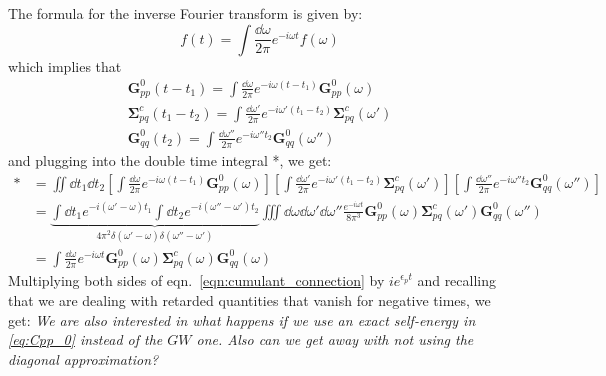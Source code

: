 The formula for the inverse Fourier transform is given by:
\begin{equation}
    f(t) = \int \frac{\dd \omega}{2\pi} e^{-i\omega t} f(\omega)
\end{equation}
which implies that
\begin{align}
    \bm{G}_{pp}^{0}(t-t_1) = \int \frac{\dd \omega}{2\pi} e^{-i\omega (t-t_1)} \bm{G}_{pp}^{0}(\omega)\\
    \bm{\Sigma}_{pq}^c(t_1 - t_2) = \int \frac{\dd \omega'}{2\pi} e^{-i\omega' (t_1 - t_2)} \bm{\Sigma}_{pq}^c(\omega')\\
    \bm{G}_{qq}^{0}(t_2) = \int \frac{\dd \omega''}{2\pi} e^{-i\omega'' t_2} \bm{G}_{qq}^{0}(\omega'')
\end{align}
and plugging into the double time integral *, we get:
\begin{align}
    * &= \iint \dd t_1 \dd t_2 \left[\int \frac{\dd \omega}{2\pi} e^{-i\omega (t-t_1)} \bm{G}_{pp}^{0}(\omega)\right] \left[\int \frac{\dd \omega'}{2\pi} e^{-i\omega' (t_1 - t_2)} \bm{\Sigma}_{pq}^c(\omega')\right] \left[\int \frac{\dd \omega''}{2\pi} e^{-i\omega'' t_2} \bm{G}_{qq}^{0}(\omega'')\right]\\
    &= \underbrace{\int \dd t_1 e^{-i \left(\omega' -\omega\right)t_1} \int \dd t_2 e^{-i \left(\omega'' -\omega'\right)t_2}}_{4\pi^2 \delta(\omega' -\omega)\delta(\omega'' -\omega')} \iiint \dd \omega \dd \omega' \dd \omega'' \frac{e^{-i\omega t}}{8\pi^3} \bm{G}_{pp}^{0}(\omega)\bm{\Sigma}_{pq}^c(\omega')\bm{G}_{qq}^{0}(\omega'')\\
    &= \int \frac{\dd \omega}{2\pi} e^{-i\omega t} \bm{G}_{pp}^{0}(\omega)\bm{\Sigma}_{pq}^c(\omega)\bm{G}_{qq}^{0}(\omega)
\end{align}
Multiplying both sides of eqn.~\ref{eqn:cumulant_connection} by $ie^{\epsilon_p t} $ and recalling that we are dealing with retarded quantities that vanish for negative times, we get:
\emph{We are also interested in what happens if we use an exact self-energy in \ref{eq:Cpp_0} instead of the $GW$ one. Also can we get away with not using the diagonal approximation?} 

